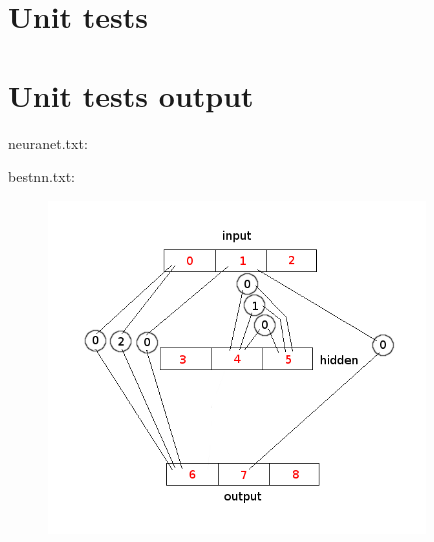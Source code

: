 \section{Unit tests}

\begin{scriptsize}
\begin{ttfamily}

\end{ttfamily}
\end{scriptsize}

\section{Unit tests output}

\begin{scriptsize}
\begin{ttfamily}

\end{ttfamily}
\end{scriptsize}

neuranet.txt:\\
\begin{scriptsize}
\begin{ttfamily}

\end{ttfamily}
\end{scriptsize}

bestnn.txt:\\
\begin{scriptsize}
\begin{ttfamily}

\end{ttfamily}
\end{scriptsize}

\begin{center}
\begin{figure}[H]
\centering\includegraphics[width=10cm]{./example.png}\\
\end{figure}
\end{center}

